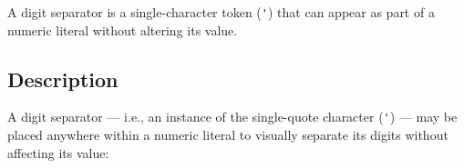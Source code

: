 
\label{digit-separators} %
\setcounter{table}{0}
\setcounter{footnote}{0}
\setcounter{lstlisting}{0}



A digit separator is a single-character token (\lstinline!'!) that can appear as part of a
numeric literal without altering its value.

\subsection[Description]{Description}\label{description}

A digit separator --- i.e., an instance of the single-quote
character (\lstinline!'!) --- may be placed anywhere within a numeric
literal to visually separate its digits without affecting its value:


